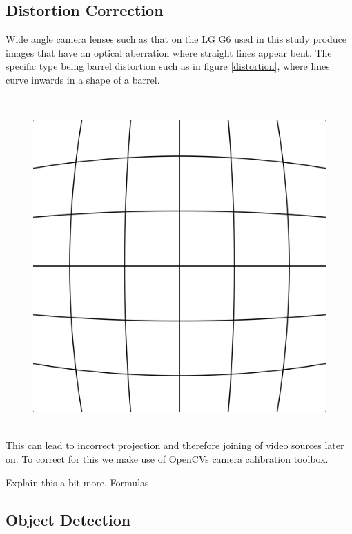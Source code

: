 \documentclass[
10pt, %
a4paper, %
oneside, %
headinclude,footinclude, %
] {book}%
\begin{document}
\subsection{Distortion Correction}

Wide angle camera lenses such as that on the LG G6 used in this study produce images that have an optical aberration where straight lines appear bent. 
The specific type being barrel distortion such as in figure \ref{distortion}, where lines curve inwards in a shape of a barrel.

\ \\ 
\begin{figure}[h]
  \includegraphics[scale=0.05]{Barrel_distortion.svg.png}
  \centering 
  \end{figure}
  \label{distortion}

\ \\
This can lead to incorrect projection and therefore joining of video sources later on.
To correct for this we make use of OpenCVs \cite{noauthor_opencv/opencv_2021} camera calibration toolbox.

Explain this a bit more. Formulas
\ \\
\subsection{Object Detection}
\end{document}
